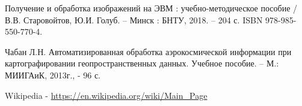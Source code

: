 \begin{thebibliography}{99}

Получение и обработка изображений на ЭВМ : учебно-методическое пособие / В.В. Старовойтов, Ю.И. Голуб. – Минск : БНТУ, 2018. – 204 с. ISBN 978-985-550-770-4. 

Чабан Л.Н. Автоматизированная обработка аэрокосмической информации при картографировании геопространственных данных. Учебное пособие. – М.: МИИГАиК, 2013г., - 96 с.

Wikipedia - \url{https://en.wikipedia.org/wiki/Main_Page}
\end{thebibliography}

